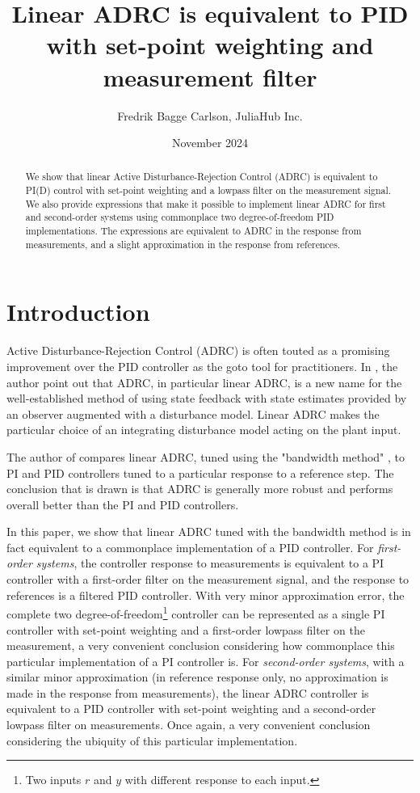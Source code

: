 \documentclass[letterpaper, 10 pt, conference]{ieeeconf}
\title{Linear ADRC is equivalent to PID with set-point weighting and measurement filter}
\author{Fredrik Bagge Carlson, JuliaHub Inc.}
\date{November 2024}
\begin{document}
\maketitle

\begin{abstract}
We show that linear Active Disturbance-Rejection Control (ADRC) is equivalent to PI(D) control with set-point weighting and a lowpass filter on the measurement signal. We also provide expressions that make it possible to implement linear ADRC for first and second-order systems using commonplace two degree-of-freedom PID implementations. The expressions are equivalent to ADRC in the response from measurements, and a slight approximation in the response from references.
\end{abstract}


\section{Introduction}
Active Disturbance-Rejection Control (ADRC) is often touted as a promising improvement over the PID controller as the goto tool for practitioners. In \cite{herbst2013simulative}, the author point out that ADRC, in particular linear ADRC, is a new name for the well-established method of using state feedback with state estimates provided by an observer augmented with a disturbance model. Linear ADRC makes the particular choice of an integrating disturbance model acting on the plant input. 

The author of \cite{herbst2013simulative} compares linear ADRC, tuned using the "bandwidth method" \cite{gao2003scaling}, to PI and PID controllers tuned to a particular response to a reference step. The conclusion that is drawn is that ADRC is generally more robust and performs overall better than the PI and PID controllers.

In this paper, we show that linear ADRC tuned with the bandwidth method is in fact equivalent to a commonplace implementation of a PID controller. For \emph{first-order systems}, the controller response to measurements is equivalent to a PI controller with a first-order filter on the measurement signal, and the response to references is a filtered PID controller. With very minor approximation error, the complete two degree-of-freedom\footnote{Two inputs $r$ and $y$ with different response to each input.} controller can be represented as a single PI controller with set-point weighting and a first-order lowpass filter on the measurement, a very convenient conclusion considering how commonplace this particular implementation of a PI controller is. For \emph{second-order systems}, with a similar minor approximation (in reference response only, no approximation is made in the response from measurements), the linear ADRC controller is equivalent to a PID controller with set-point weighting and a second-order lowpass filter on measurements. Once again, a very convenient conclusion considering the ubiquity of this particular implementation.
\end{document}
